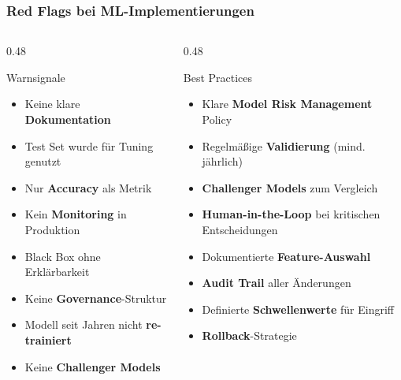 \documentclass[11pt, aspectratio=169]{beamer}
\begin{document}
\begin{frame}
    \frametitle{Red Flags bei ML-Implementierungen}
    \begin{columns}[t]
        \begin{column}{0.48\textwidth}
            \begin{alertblock}{Warnsignale}
                \begin{itemize}
                    \item Keine klare \textbf{Dokumentation}
                    \item Test Set wurde für Tuning genutzt
                    \item Nur \textbf{Accuracy} als Metrik
                    \item Kein \textbf{Monitoring} in Produktion
                    \item \glqq Black Box\grqq{} ohne Erklärbarkeit
                    \item Keine \textbf{Governance}-Struktur
                    \item Modell seit Jahren nicht \textbf{re-trainiert}
                    \item Keine \textbf{Challenger Models}
                \end{itemize}
            \end{alertblock}
        \end{column}
        \begin{column}{0.48\textwidth}
            \begin{block}{Best Practices}
                \begin{itemize}
                    \item Klare \textbf{Model Risk Management} Policy
                    \item Regelmäßige \textbf{Validierung} (mind. jährlich)
                    \item \textbf{Challenger Models} zum Vergleich
                    \item \textbf{Human-in-the-Loop} bei kritischen Entscheidungen
                    \item Dokumentierte \textbf{Feature-Auswahl}
                    \item \textbf{Audit Trail} aller Änderungen
                    \item Definierte \textbf{Schwellenwerte} für Eingriff
                    \item \textbf{Rollback}-Strategie
                \end{itemize}
            \end{block}
        \end{column}
    \end{columns}
\end{frame}
\end{document}
